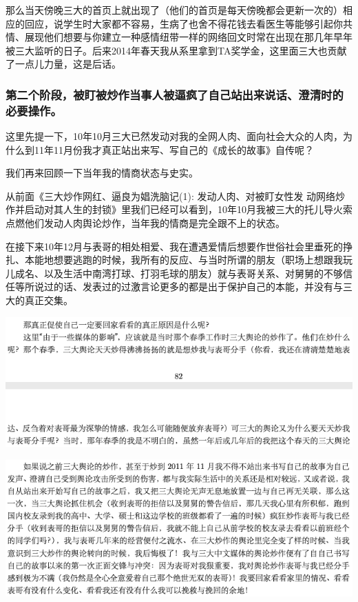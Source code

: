 \documentclass[9pt, b5paper]{article}
\begin{document}
那么当天傍晚三大的首页上就出现了（他们的首页是每天傍晚都会更新一次的）相应的回应，说学生时大家都不容易，生病了也舍不得花钱去看医生等能够引起你共情、展现他们想要与你建立一种感情纽带一样的网络回文时常在出现在那几年早年被三大监听的日子。后来2014年春天我从系里拿到TA奖学金，这里面三大也贡献了一点儿力量，这是后话。 

\subsubsection{第二个阶段，被盯被炒作当事人被逼疯了自己站出来说话、澄清时的必要操作。}
\label{sec:orge02b8fd}

这里先提一下，10年10月三大已然发动对我的全网人肉、面向社会大众的人肉，为什么到11年11月份我才真正站出来写、写自己的《成长的故事》自传呢？

我们再来回顾一下当年我的情商状态与史实。 

从前面《三大炒作网红、逼良为娼洗脑记(1): 发动人肉、对被盯女性发 动网络炒作并启动对其人生的封锁》里我们已经可以看到，10年10月我被三大的托儿导火索点燃他们发动人肉舆论炒作，当年我的情商是完全跟不上的状态。 

在接下来10年12月与表哥的相处相爱、我在遭遇爱情后想要作世俗社会里垂死的挣扎、本能地想要逃跑的时候，我所有的反应、与当时所谓的朋友（职场上想跟我玩儿成名、以及生活中南湾打球、打羽毛球的朋友）就与表哥关系、对舅舅的不够信任等所说过的话、发表过的过激言论更多的都是出于保护自己的本能，并没有与三大的真正交集。

\begin{center}
\includegraphics[width=.9\linewidth]{./pic/backups_plans_20210412_173011.png}
\end{center}

\begin{center}
\includegraphics[width=.9\linewidth]{./pic/backups_plans_20210412_173106.png}
\end{center}
\end{document}
